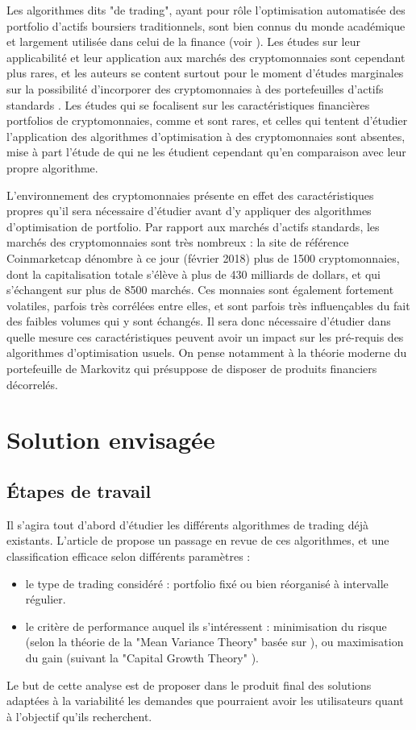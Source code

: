 \documentclass[a4paper]{article}
\begin{document}
Les algorithmes dits "de trading", ayant pour rôle l'optimisation automatisée des portfolio d'actifs boursiers traditionnels, sont bien connus du monde académique et largement utilisée dans celui de la finance (voir \cite{Li2014}). Les études sur leur applicabilité et leur application aux marchés des cryptomonnaies sont cependant plus rares, et les auteurs se content surtout pour le moment d'études marginales sur la possibilité d'incorporer des cryptomonnaies à des portefeuilles d'actifs standards \cite{Elendner2018}. Les études qui se focalisent sur les caractéristiques financières portfolios de cryptomonnaies, comme \cite{KuoChuen17} et \cite{Chen2018} sont rares, et celles qui tentent d'étudier l'application des algorithmes d'optimisation à des cryptomonnaies sont absentes, mise à part l'étude de \citet{Jiang2017} qui ne les étudient cependant qu'en comparaison avec leur propre algorithme.

L'environnement des cryptomonnaies présente en effet des caractéristiques propres qu'il sera nécessaire d'étudier avant d'y appliquer des algorithmes d'optimisation de portfolio. Par rapport aux marchés d'actifs standards, les marchés des cryptomonnaies sont très nombreux : la site de référence Coinmarketcap dénombre à ce jour (février 2018) plus de 1500 cryptomonnaies, dont la capitalisation totale s'élève à plus de 430 milliards de dollars, et qui s'échangent sur plus de 8500 marchés. Ces monnaies sont également fortement volatiles, parfois très corrélées entre elles, et sont parfois très influençables du fait des faibles volumes qui y sont échangés. Il sera donc nécessaire d'étudier dans quelle mesure ces caractéristiques peuvent avoir un impact sur les pré-requis des algorithmes d'optimisation usuels. On pense notamment à la théorie moderne du portefeuille de Markovitz qui présuppose de disposer de produits financiers décorrelés.

\section{Solution envisagée}

\subsection{Étapes de travail}

Il s'agira tout d'abord d'étudier les différents algorithmes de trading déjà existants. L'article de \citet{Li2014} propose un passage en revue de ces algorithmes, et une classification efficace selon différents paramètres :
\begin{itemize}
    \item le type de trading considéré : portfolio fixé ou bien réorganisé à intervalle régulier.
    \item le critère de performance auquel ils s'intéressent : minimisation du risque (selon la théorie de la "Mean Variance Theory" basée sur \citet{Markovitz1952}), ou maximisation du gain (suivant la "Capital Growth Theory" \cite{Hakansson2011}).
\end{itemize}
Le but de cette analyse est de proposer dans le produit final des solutions adaptées à la variabilité les demandes que pourraient avoir les utilisateurs quant à l'objectif qu'ils recherchent.
\end{document}
